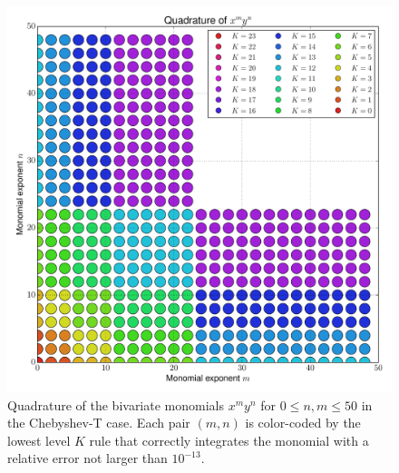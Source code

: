 \documentclass[a4paper,10pt]{article}
\begin{document}
\begin{figure}[h]
  \centering
  \includegraphics[width=\linewidth]{./img/monomial_errors_chebyshevt_2D.pdf}
  \caption{Quadrature of the bivariate monomials $x^m y^n$ for $0 \leq n, m \leq 50$
  in the Chebyshev-T case.
  Each pair $(m,n)$ is color-coded by the lowest level $K$ rule that correctly
  integrates the monomial with a relative error not larger than $10^{-13}$.}
  \label{fig:monomial_errors_chebyshevt_2D}
\end{figure}
\end{document}
